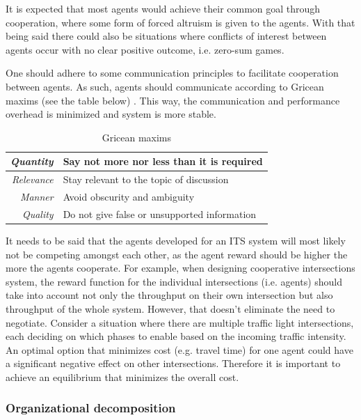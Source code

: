 \documentclass[main.tex]{subfiles}
\begin{document}
It is expected that most agents would achieve their common goal through cooperation, where some
form of forced altruism is given to the agents. With that being said there could also be
situations where conflicts of interest between agents occur with no clear positive outcome,
i.e. zero-sum games.

One should adhere to some communication principles to facilitate cooperation between agents. As
such, agents should communicate according to Gricean maxims (see the table below)
\cite{Shoham}. This way, the communication and performance overhead is minimized and system 
is more stable. 


\begin{table}[htbp]
    \renewcommand{\arraystretch}{1.7}
    \setlength{\tabcolsep}{1em}
    \caption{Gricean maxims}
    \centering\begin{tabular}{>{\itshape}rl}
       \toprule
       Quantity & Say not more nor less than it is required \\ 
       \midrule
       Relevance &  Stay relevant to the topic of discussion \\
       \midrule
       Manner & Avoid obscurity and ambiguity \\ 
       \midrule
       Quality & Do not give false or unsupported information \\
       \bottomrule
    \end{tabular}
    \label{maxims}
\end{table}

It needs to be said that the agents developed for an ITS system will most likely not be competing 
amongst each other, as the agent reward should be higher the more the agents cooperate. For example, 
when designing cooperative intersections system, the reward function for the individual intersections
(i.e. agents) should take into account not only the throughput on their own intersection but also 
throughput of the whole system. However, that doesn't eliminate the need to negotiate. Consider a 
situation where there are multiple traffic light intersections, each deciding on which phases to 
enable based on the incoming traffic intensity. An optimal option that minimizes cost (e.g. 
travel time) for one agent could have a significant negative effect on other intersections. 
Therefore it is important to achieve an equilibrium that minimizes the overall cost. 

\subsubsection{Organizational decomposition}
\end{document}
